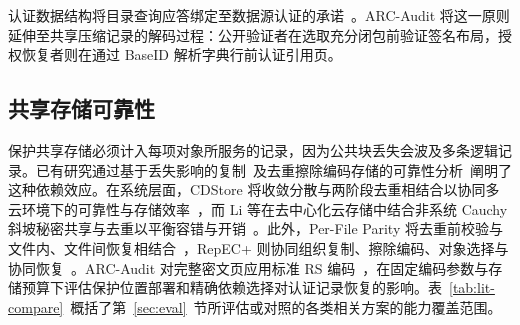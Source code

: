 \documentclass[10pt,journal]{IEEEtran}
\begin{document}
认证数据结构将目录查询应答绑定至数据源认证的承诺~\cite{Goodrich2003ADS}。ARC-Audit 将这一原则延伸至共享压缩记录的解码过程：公开验证者在选取充分闭包前验证签名布局，授权恢复者则在通过 BaseID 解析字典行前认证引用页。

\subsection{共享存储可靠性}
保护共享存储必须计入每项对象所服务的记录，因为公共块丢失会波及多条逻辑记录。已有研究通过基于丢失影响的复制~\cite{Bhagwat2006Reliability}及去重擦除编码存储的可靠性分析~\cite{Li2010Reliability}阐明了这种依赖效应。在系统层面，CDStore 将收敛分散与两阶段去重相结合以协同多云环境下的可靠性与存储效率~\cite{Li2015CDStore}，而 Li 等在去中心化云存储中结合非系统 Cauchy 斜坡秘密共享与去重以平衡容错与开销~\cite{Li2024TNSE}。此外，Per-File Parity 将去重前校验与文件内、文件间恢复相结合~\cite{Wu2019PFP}，RepEC+ 则协同组织复制、擦除编码、对象选择与协同恢复~\cite{Zuo2022RepECPlus}。ARC-Audit 对完整密文页应用标准 RS 编码~\cite{ReedSolomon1960}，在固定编码参数与存储预算下评估保护位置部署和精确依赖选择对认证记录恢复的影响。表~\ref{tab:lit-compare}~概括了第~\ref{sec:eval}~节所评估或对照的各类相关方案的能力覆盖范围。
\end{document}
